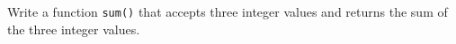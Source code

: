 Write a function \texttt{sum()} that accepts three integer values and returns the sum of the three integer values.

